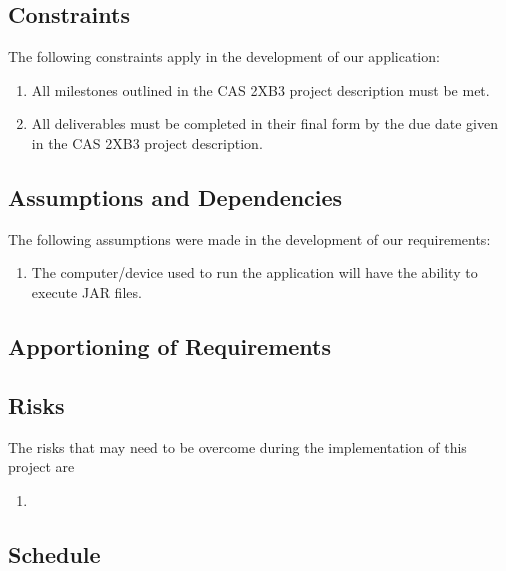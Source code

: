 \documentclass[english]{article}
\begin{document}
\subsection{Constraints}
\label{sub:constraints}

\label{sub:constraints}
The following constraints apply in the development of our application:
\begin{enumerate}
	\item All milestones outlined in the CAS 2XB3 project description must be met.
	\item All deliverables must be completed in their final form by the due date given in the CAS 2XB3 project description.
\end{enumerate}

\subsection{Assumptions and Dependencies}
\label{sub:assumptions_and_dependencies}
The following assumptions were made in the development of our requirements:
\begin{enumerate}
	\item The computer/device used to run the application will have the ability to execute JAR files. 
\end{enumerate}

\subsection{Apportioning of Requirements}
\label{sub:apportioning_of_requirements}


\color{red}\subsection{Risks}

The risks that may need to be overcome during the implementation of this project are 

\medskip
\begin{enumerate}

\item
\end{enumerate}
\subsection{Schedule} 
\end{document}
